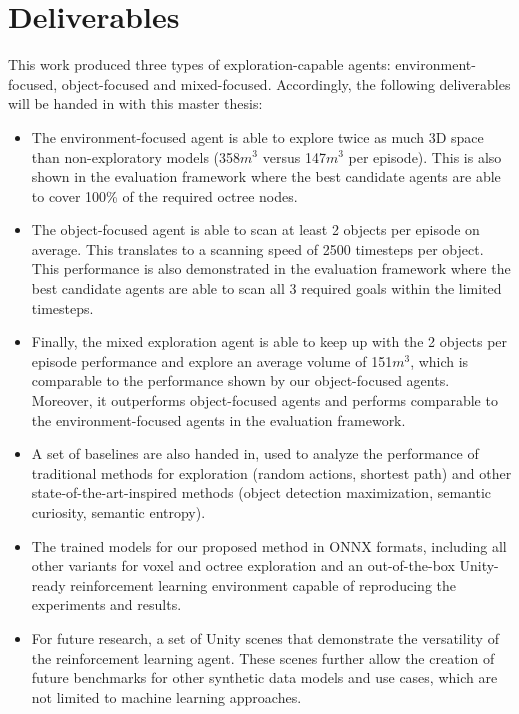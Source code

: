 \section{Deliverables} \label{chap:4:deliverables}
This work produced three types of exploration-capable agents: environment-focused, object-focused and mixed-focused. Accordingly, the following deliverables will be handed in with this master thesis:
\begin{itemize}
    \item 
    The environment-focused agent is able to explore twice as much 3D space than non-exploratory models (358$m^3$ versus 147$m^3$ per episode). This is also shown in the evaluation framework where the best candidate agents are able to cover 100\% of the required octree nodes. 
    
    \item  The object-focused agent is able to scan at least 2 objects per episode on average. This translates to a scanning speed of 2500 timesteps per object. This performance is also demonstrated in the evaluation framework where the best candidate agents are able to scan all 3 required goals within the limited timesteps.
    
    \item Finally, the mixed exploration agent is able to keep up with the 2 objects per episode performance and explore an average volume of 151$m^3$, which is comparable to the performance shown by our object-focused agents. Moreover, it outperforms object-focused agents and performs comparable to the environment-focused agents in the evaluation framework.
   
   \item A set of baselines are also handed in, used to analyze the performance of traditional methods for exploration (random actions, shortest path) and other state-of-the-art-inspired methods (object detection maximization, semantic curiosity, semantic entropy).
   
    \item The trained models for our proposed method in ONNX formats, including all other variants for voxel and octree exploration and an out-of-the-box Unity-ready reinforcement learning environment capable of reproducing the experiments and results.

    \item For future research, a set of Unity scenes that demonstrate the versatility of the reinforcement learning agent. These scenes further allow the creation of future benchmarks for other synthetic data models and use cases, which are not limited to machine learning approaches.
\end{itemize}
